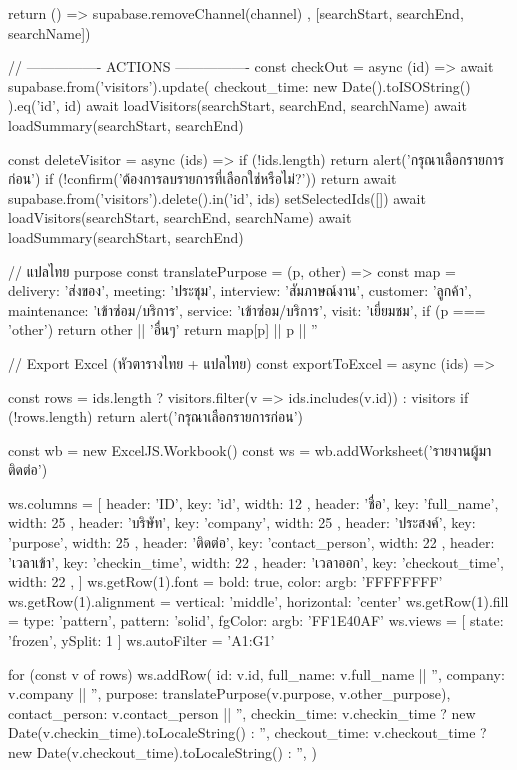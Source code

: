 {{    return () => supabase.removeChannel(channel)
  }, [searchStart, searchEnd, searchName])

  // ---------------- ACTIONS ----------------
  const checkOut = async (id) => {
    await supabase.from('visitors').update({ checkout_time: new Date().toISOString() }).eq('id', id)
    await loadVisitors(searchStart, searchEnd, searchName)
    await loadSummary(searchStart, searchEnd)
  }

  const deleteVisitor = async (ids) => {
    if (!ids.length) return alert('กรุณาเลือกรายการก่อน')
    if (!confirm('ต้องการลบรายการที่เลือกใช่หรือไม่?')) return
    await supabase.from('visitors').delete().in('id', ids)
    setSelectedIds([])
    await loadVisitors(searchStart, searchEnd, searchName)
    await loadSummary(searchStart, searchEnd)
  }

  // แปลไทย purpose
  const translatePurpose = (p, other) => {
    const map = {
      delivery: 'ส่งของ',
      meeting: 'ประชุม',
      interview: 'สัมภาษณ์งาน',
      customer: 'ลูกค้า',
      maintenance: 'เข้าซ่อม/บริการ',
      service: 'เข้าซ่อม/บริการ',
      visit: 'เยี่ยมชม',
    }
    if (p === 'other') return other || 'อื่นๆ'
    return map[p] || p || ''
  }

  // Export Excel (หัวตารางไทย + แปลไทย)
  const exportToExcel = async (ids) => {
    const rows = ids.length ? visitors.filter(v => ids.includes(v.id)) : visitors
    if (!rows.length) return alert('กรุณาเลือกรายการก่อน')

    const wb = new ExcelJS.Workbook()
    const ws = wb.addWorksheet('รายงานผู้มาติดต่อ')

    ws.columns = [
      { header: 'ID', key: 'id', width: 12 },
      { header: 'ชื่อ', key: 'full_name', width: 25 },
      { header: 'บริษัท', key: 'company', width: 25 },
      { header: 'ประสงค์', key: 'purpose', width: 25 },
      { header: 'ติดต่อ', key: 'contact_person', width: 22 },
      { header: 'เวลาเข้า', key: 'checkin_time', width: 22 },
      { header: 'เวลาออก', key: 'checkout_time', width: 22 },
    ]
    ws.getRow(1).font = { bold: true, color: { argb: 'FFFFFFFF' } }
    ws.getRow(1).alignment = { vertical: 'middle', horizontal: 'center' }
    ws.getRow(1).fill = { type: 'pattern', pattern: 'solid', fgColor: { argb: 'FF1E40AF' } }
    ws.views = [{ state: 'frozen', ySplit: 1 }]
    ws.autoFilter = 'A1:G1'

    for (const v of rows) {
      ws.addRow({
        id: v.id,
        full_name: v.full_name || '',
        company: v.company || '',
        purpose: translatePurpose(v.purpose, v.other_purpose),
        contact_person: v.contact_person || '',
        checkin_time: v.checkin_time ? new Date(v.checkin_time).toLocaleString() : '',
        checkout_time: v.checkout_time ? new Date(v.checkout_time).toLocaleString() : '',
      })
    }

}}
